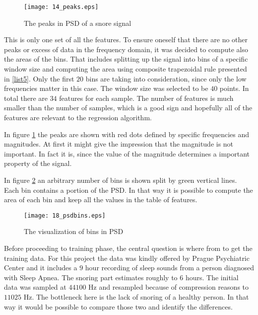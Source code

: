 \begin{figure}[!ht]
\centering
  \texttt{[image: 14\_peaks.eps]}
\caption{The peaks in PSD of a snore signal}
\label{fig:peaks}
\end{figure}

This is only one set of all the features. To ensure oneself that there are no other peaks or excess of data in the frequency domain, it was decided to compute also the areas of the bins. That includes splitting up the signal into bins of a specific window size and computing the area using composite trapezoidal rule presented in \ref{list5}. Only the first $20$ bins are taking into consideration, since only the low frequencies matter in this case. The window size was selected to be $40$ points. In total there are $34$ features for each sample. The number of features is much smaller than the number of samples, which is a good sign and hopefully all of the features are relevant to the regression algorithm.

In figure \ref{fig:peaks} the peaks are shown with red dots defined by specific frequencies and magnitudes. At first it might give the impression that the magnitude is not important. In fact it is, since the value of the magnitude determines a important property of the signal.

In figure \ref{fig:bins} an arbitrary number of bins is shown split by green vertical lines. Each bin contains a portion of the PSD. In that way it is possible to compute the area of each bin and keep all the values in the table of features.



\begin{figure}[!ht]
\centering
  \texttt{[image: 18\_psdbins.eps]}
\caption{The visualization of bins in PSD}
\label{fig:bins}
\end{figure}

Before proceeding to training phase, the central question is where from to get the training data. For this project the data was kindly offered by Prague Psychiatric Center \cite{pcp} and it includes a $9$ hour recording of sleep sounds from a person diagnosed with Sleep Apnea. The snoring part estimates roughly to $6$ hours. The initial data was sampled at $44100$ Hz and resampled because of compression reasons to $11025$ Hz. The bottleneck here is the lack of snoring of a healthy person. In that way it would be possible to compare those two and identify the differences. 

